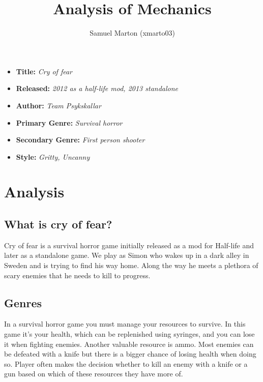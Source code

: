 \documentclass[a4paper,10pt,english]{article}
\title{%
Analysis of Mechanics%
}
\author{%
Samuel Marton (xmarto03)%
}
\date{}
\begin{document}
\maketitle
\thispagestyle{empty}

{%
\large

\begin{itemize}

\item[] \textbf{Title:} \textit{Cry of fear}

\item[] \textbf{Released:} \textit{2012 as a half-life mod, 2013 standalone}

\item[] \textbf{Author:} \textit{Team Psykskallar}

\item[] \textbf{Primary Genre:} \textit{Survival horror}

\item[] \textbf{Secondary Genre:} \textit{First person shooter}

\item[] \textbf{Style:} \textit{Gritty, Uncanny}

\end{itemize}

}

\section*{\centering Analysis}

\subsection*{What is cry of fear?}

Cry of fear is a survival horror game initially released as a mod for Half-life and later as a standalone game. We play as Simon who wakes up in a dark alley in Sweden and is trying to find his way home. Along the way he meets a plethora of scary enemies that he needs to kill to progress. 

\subsection*{Genres}

In a survival horror game you must manage your resources to survive. In this game it's your health, which can be replenished using syringes, and you can lose it when fighting enemies. Another valuable resource is ammo. Most enemies can be defeated with a knife but there is a bigger chance of losing health when doing so. Player often makes the decision whether to kill an enemy with a knife or a gun based on which of these resources they have more of.
\end{document}
